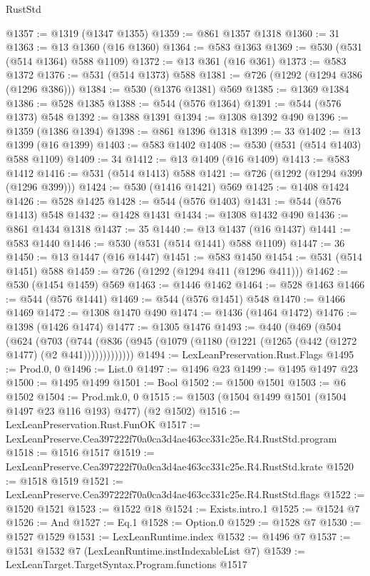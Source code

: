 \begin{lexlean}{RustStd}
\begin{coremodule}
@1357 := @1319 (@1347 @1355)
@1359 := @861 @1357 @1318
@1360 := 31
@1363 := @13 @1360 (@16 @1360)
@1364 := @583 @1363
@1369 := @530 (@531 (@514 @1364) @588 @1109)
@1372 := @13 @361 (@16 @361)
@1373 := @583 @1372
@1376 := @531 (@514 @1373) @588
@1381 := @726 (@1292 (@1294 @386 (@1296 @386)))
@1384 := @530 (@1376 @1381) @569
@1385 := @1369 @1384
@1386 := @528 @1385
@1388 := @544 (@576 @1364)
@1391 := @544 (@576 @1373) @548
@1392 := @1388 @1391
@1394 := @1308 @1392 @490
@1396 := @1359 (@1386 @1394)
@1398 := @861 @1396 @1318
@1399 := 33
@1402 := @13 @1399 (@16 @1399)
@1403 := @583 @1402
@1408 := @530 (@531 (@514 @1403) @588 @1109)
@1409 := 34
@1412 := @13 @1409 (@16 @1409)
@1413 := @583 @1412
@1416 := @531 (@514 @1413) @588
@1421 := @726 (@1292 (@1294 @399 (@1296 @399)))
@1424 := @530 (@1416 @1421) @569
@1425 := @1408 @1424
@1426 := @528 @1425
@1428 := @544 (@576 @1403)
@1431 := @544 (@576 @1413) @548
@1432 := @1428 @1431
@1434 := @1308 @1432 @490
@1436 := @861 @1434 @1318
@1437 := 35
@1440 := @13 @1437 (@16 @1437)
@1441 := @583 @1440
@1446 := @530 (@531 (@514 @1441) @588 @1109)
@1447 := 36
@1450 := @13 @1447 (@16 @1447)
@1451 := @583 @1450
@1454 := @531 (@514 @1451) @588
@1459 := @726 (@1292 (@1294 @411 (@1296 @411)))
@1462 := @530 (@1454 @1459) @569
@1463 := @1446 @1462
@1464 := @528 @1463
@1466 := @544 (@576 @1441)
@1469 := @544 (@576 @1451) @548
@1470 := @1466 @1469
@1472 := @1308 @1470 @490
@1474 := @1436 (@1464 @1472)
@1476 := @1398 (@1426 @1474)
@1477 := @1305 @1476
@1493 := @440
    (@469
      (@504
        (@624
          (@703
            (@744 (@836 (@945 (@1079 (@1180 (@1221 (@1265 (@442 (@1272 @1477) (@2 @441)))))))))))))
@1494 := LexLeanPreservation.Rust.Flags
@1495 := Prod.{0, 0}
@1496 := List.{0}
@1497 := @1496 @23
@1499 := @1495 @1497 @23
@1500 := @1495 @1499
@1501 := Bool
@1502 := @1500 @1501
@1503 := @6 @1502
@1504 := Prod.mk.{0, 0}
@1515 := @1503 (@1504 @1499 @1501 (@1504 @1497 @23 @116 @193) @477) (@2 @1502)
@1516 := LexLeanPreservation.Rust.FunOK
@1517 := LexLeanPreserve.Cea397222f70a0ca3d4ae463cc331c25e.R4.RustStd.program
@1518 := @1516 @1517
@1519 := LexLeanPreserve.Cea397222f70a0ca3d4ae463cc331c25e.R4.RustStd.krate
@1520 := @1518 @1519
@1521 := LexLeanPreserve.Cea397222f70a0ca3d4ae463cc331c25e.R4.RustStd.flags
@1522 := @1520 @1521
@1523 := @1522 @18
@1524 := Exists.intro.{1}
@1525 := @1524 @7
@1526 := And
@1527 := Eq.{1}
@1528 := Option.{0}
@1529 := @1528 @7
@1530 := @1527 @1529
@1531 := LexLeanRuntime.index
@1532 := @1496 @7
@1537 := @1531 @1532 @7 (LexLeanRuntime.instIndexableList @7)
@1539 := LexLeanTarget.TargetSyntax.Program.functions @1517

\end{coremodule}
\end{lexlean}
